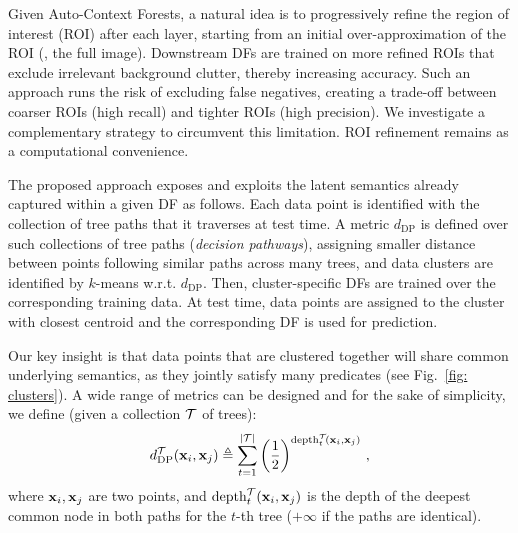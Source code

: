 Given Auto-Context Forests, a natural idea is to progressively refine the region of interest (ROI) after each layer, starting from an initial over-approximation of the ROI (\eg, the full image). Downstream DFs are trained on 
more refined ROIs that exclude irrelevant background clutter, thereby increasing accuracy. 
Such an approach runs the risk of excluding false negatives, creating a trade-off between coarser ROIs (high recall) and tighter ROIs (high precision). We investigate a complementary strategy to circumvent this limitation. ROI refinement remains as a computational convenience.

The proposed approach exposes and exploits the latent semantics already captured within a given DF as follows. Each data point is identified with the collection of tree paths that it traverses at test time. A metric $d_{\text{DP}}$ is defined over such collections of tree paths (\textit{decision pathways}), assigning smaller distance between points following similar paths across many trees, and data clusters are identified by $k$-means w.r.t. $d_{\text{DP}}$. %
Then, cluster-specific DFs are trained over the corresponding training data. At test time, data points are assigned to the cluster with closest centroid and the corresponding DF is used for prediction.

Our key insight is that data points that are clustered together will share common underlying semantics, as they jointly satisfy many predicates (see Fig.~\ref{fig: clusters}). A wide range of metrics can be designed and for the sake of simplicity, we define (given a collection $\mathcal{T}$ of trees):
\begin{equation}
d_{\text{DP}}^{\mathcal{T}}(\boldsymbol{\mathrm{x}}_i, \boldsymbol{\mathrm{x}}_j)\triangleq \sum_{t=1}^{\vert\mathcal{T}\vert} \left(\frac{1}{2}\right)^{\text{depth}_t^{\mathcal{T}}\!(\boldsymbol{\mathrm{x}}_i,\boldsymbol{\mathrm{x}}_j)}\, ,
\end{equation}
where $\boldsymbol{\mathrm{x}}_i, \boldsymbol{\mathrm{x}}_j$ are two points, and $\text{depth}_t^{\mathcal{T}}(\boldsymbol{\mathrm{x}}_i,\boldsymbol{\mathrm{x}}_j)$ is the depth of the deepest common node in both paths for the $t$-th tree ($+\infty$ if the paths are identical).

